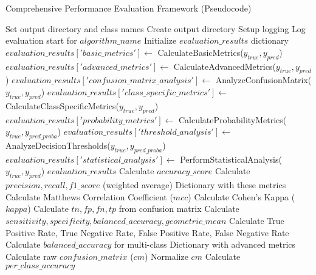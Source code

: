 \begin{algorithm}[!htbp]
\caption{Comprehensive Performance Evaluation Framework (Pseudocode)}
\label{alg:performance-evaluation}
\begin{algorithmic}[1]
    \State Set output directory and class names
    \State Create output directory
    \State Setup logging
\EndProcedure
\Statex
{}
    \State Log evaluation start for $algorithm\_name$
    \State Initialize $evaluation\_results$ dictionary
    \State $evaluation\_results['basic\_metrics'] \leftarrow$ CalculateBasicMetrics($y_{true}, y_{pred}$)
    \State $evaluation\_results['advanced\_metrics'] \leftarrow$ CalculateAdvancedMetrics($y_{true}, y_{pred}$)
    \State $evaluation\_results['confusion\_matrix\_analysis'] \leftarrow$ AnalyzeConfusionMatrix($y_{true}, y_{pred}$)
    \State $evaluation\_results['class\_specific\_metrics'] \leftarrow$ CalculateClassSpecificMetrics($y_{true}, y_{pred}$)
        \State $evaluation\_results['probability\_metrics'] \leftarrow$ CalculateProbabilityMetrics($y_{true}, y_{pred\_proba}$)
        \State $evaluation\_results['threshold\_analysis'] \leftarrow$ AnalyzeDecisionThresholds($y_{true}, y_{pred\_proba}$)
    \EndIf
    \State $evaluation\_results['statistical\_analysis'] \leftarrow$ PerformStatisticalAnalysis($y_{true}, y_{pred}$)
    \Return $evaluation\_results$
\EndProcedure
\Statex
{}
    \State Calculate $accuracy\_score$
    \State Calculate $precision, recall, f1\_score$ (weighted average)
    \Return Dictionary with these metrics
\EndFunction
\Statex
{}
    \State Calculate Matthews Correlation Coefficient ($mcc$)
    \State Calculate Cohen's Kappa ($kappa$)
        \State Calculate $tn, fp, fn, tp$ from confusion matrix
        \State Calculate $sensitivity, specificity, balanced\_accuracy, geometric\_mean$
        \State Calculate True Positive Rate, True Negative Rate, False Positive Rate, False Negative Rate
    \Else {}
        \State Calculate $balanced\_accuracy$ for multi-class
    \EndIf
    \Return Dictionary with advanced metrics
\EndFunction
\Statex
{}
    \State Calculate raw $confusion\_matrix$ ($cm$)
    \State Normalize $cm$
    \State Calculate $per\_class\_accuracy$

\end{algorithmic}
\end{algorithm}

